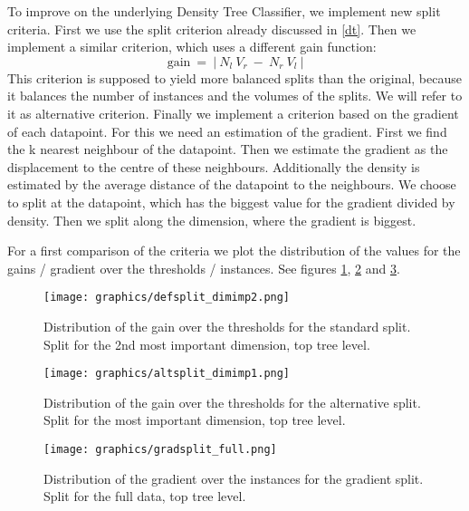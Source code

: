 \documentclass[draft]{article}
\begin{document}
\iftrue
To improve on the underlying Density Tree Classifier, we implement new split criteria.
First we use the split criterion already discussed in \ref{dt}. 
Then we implement a similar criterion, which uses a different gain function:
\begin{equation}
	\textrm{gain} ~  = ~ | ~ N_l ~ V_r ~ - ~ N_r ~ V_l ~ |
\end{equation}
This criterion is supposed to yield more balanced splits than the original, because it balances the 
number of instances and the volumes of the splits. We will refer to it as alternative criterion.
\newline
Finally we implement a criterion based on the gradient of each datapoint.
For this we need an estimation of the gradient. First we find the k nearest neighbour of
the datapoint. Then we estimate the gradient as the displacement to the centre of these neighbours.
Additionally the density is estimated by the average distance of the datapoint to the neighbours.
We choose to split at the datapoint, which has the biggest value for the gradient divided by density.
Then we split along the dimension, where the gradient is biggest.

For a first comparison of the criteria we plot the distribution of the values for the gains / gradient
over the thresholds / instances. See figures \ref{fig2a}, \ref{fig2b} and \ref{fig2c}.


\begin{figure}[h]
	\centering
	\texttt{[image: graphics/defsplit\_dimimp2.png]}
	\caption{Distribution of the gain over the thresholds for the standard split.
	Split for the 2nd most important dimension, top tree level.}
	\label{fig2a}
\end{figure}

\begin{figure}[h]
	\centering
	\texttt{[image: graphics/altsplit\_dimimp1.png]}
	\caption{Distribution of the gain over the thresholds for the alternative split.
	Split for the most important dimension, top tree level.}
	\label{fig2b}
\end{figure}
\fi

\begin{figure}[h]
	\centering
	\texttt{[image: graphics/gradsplit\_full.png]}
	\caption{Distribution of the gradient over the instances for the gradient split.
	Split for the full data, top tree level.}
	\label{fig2c}
\end{figure}
\end{document}
